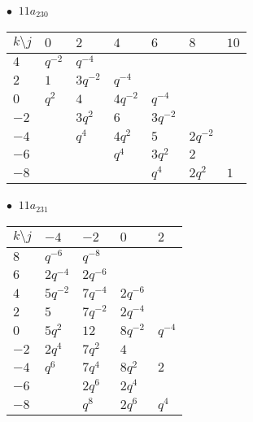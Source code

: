 \begin{minipage}{\linewidth}
$\bullet\ $ $11a_{230}$ \vspace{0.5em} \\
\begin{tabular}{l|llllll}
$k \setminus j$ & $0$ & $2$ & $4$ & $6$ & $8$ & $10$ \\
\hline
$4$ & $q^{-2}$ & $q^{-4}$ &  &  &  &  \\
$2$ & $1$ & $3q^{-2}$ & $q^{-4}$ &  &  &  \\
$0$ & $q^{2}$ & $4$ & $4q^{-2}$ & $q^{-4}$ &  &  \\
$-2$ &  & $3q^{2}$ & $6$ & $3q^{-2}$ &  &  \\
$-4$ &  & $q^{4}$ & $4q^{2}$ & $5$ & $2q^{-2}$ &  \\
$-6$ &  &  & $q^{4}$ & $3q^{2}$ & $2$ &  \\
$-8$ &  &  &  & $q^{4}$ & $2q^{2}$ & $1$ \\
\end{tabular}
\vspace{2em}
\end{minipage}
%
\begin{minipage}{\linewidth}
$\bullet\ $ $11a_{231}$ \vspace{0.5em} \\
\begin{tabular}{l|llll}
$k \setminus j$ & $-4$ & $-2$ & $0$ & $2$ \\
\hline
$8$ & $q^{-6}$ & $q^{-8}$ &  &  \\
$6$ & $2q^{-4}$ & $2q^{-6}$ &  &  \\
$4$ & $5q^{-2}$ & $7q^{-4}$ & $2q^{-6}$ &  \\
$2$ & $5$ & $7q^{-2}$ & $2q^{-4}$ &  \\
$0$ & $5q^{2}$ & $12$ & $8q^{-2}$ & $q^{-4}$ \\
$-2$ & $2q^{4}$ & $7q^{2}$ & $4$ &  \\
$-4$ & $q^{6}$ & $7q^{4}$ & $8q^{2}$ & $2$ \\
$-6$ &  & $2q^{6}$ & $2q^{4}$ &  \\
$-8$ &  & $q^{8}$ & $2q^{6}$ & $q^{4}$ \\
\end{tabular}
\vspace{2em}
\end{minipage}
%
